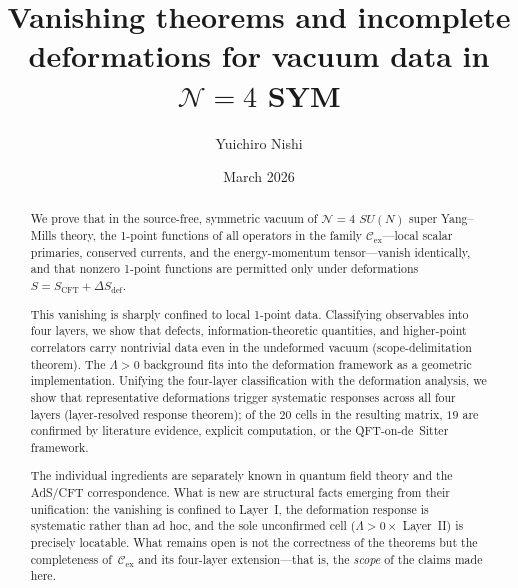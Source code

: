 \documentclass[
  aps,
  prd,
  preprint,
  groupedaddress,
  nofootinbib,
  longbibliography
]{revtex4-2}
\theoremstyle{remark}
\newcommand{\Cex}{\mathcal{C}_{\mathrm{ex}}}
\newcommand{\N}{\mathcal{N}}
\begin{document}
\title{Vanishing theorems and incomplete deformations
  for vacuum data in \texorpdfstring{$\N=4$}{N=4} SYM}

\author{Yuichiro Nishi}

\date{March 2026}

\begin{abstract}
We prove that in the source-free, symmetric vacuum of $\N=4$
$SU(N)$ super Yang--Mills theory, the 1-point functions of all
operators in the family
$\Cex$---local scalar primaries, conserved currents, and the
energy-momentum tensor---vanish identically,
and that nonzero 1-point functions are permitted only under
deformations $S = S_{\mathrm{CFT}} + \Delta S_{\mathrm{def}}$.

This vanishing is sharply confined to local 1-point data.
Classifying observables into four layers, we show that
defects, information-theoretic quantities, and higher-point
correlators carry nontrivial data even in the undeformed vacuum
(scope-delimitation theorem).
The $\Lambda>0$ background fits into the deformation framework
as a geometric implementation.
Unifying the four-layer classification with the deformation
analysis, we show that representative deformations trigger
systematic responses across all four layers
(layer-resolved response theorem);
of the $20$ cells in the resulting matrix, $19$ are confirmed
by literature evidence, explicit computation, or the
QFT-on-de~Sitter framework.

The individual ingredients are separately known in quantum field
theory and the AdS/CFT correspondence.
What is new are structural facts emerging from their unification:
the vanishing is confined to Layer~I,
the deformation response is systematic rather than ad hoc,
and the sole unconfirmed cell
($\Lambda>0 \times$ Layer~II) is precisely locatable.
What remains open is not the correctness of the theorems but
the completeness of~$\Cex$ and its four-layer
extension---that is, the \emph{scope} of the claims made here.
\end{abstract}

\maketitle
\clearpage
\tableofcontents

\end{document}
